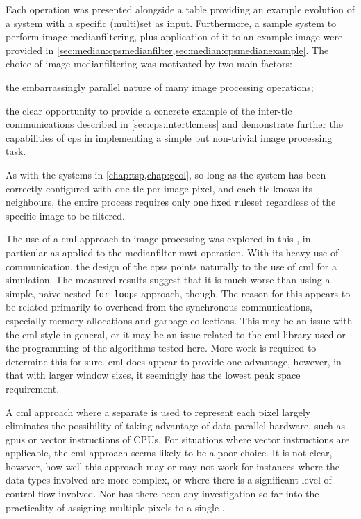 Each operation was presented alongside a table providing an example evolution of a system with a specific (multi)set as input.  Furthermore, a sample system to perform image \gls{medianfilter}ing, plus application of it to an example image were provided in \cref{sec:median:cpsmedianfilter,sec:median:cpsmedianexample}.  The choice of image \gls{medianfilter}ing was motivated by two main factors:
\begin{inparaenum}[(i)]
\item the embarrassingly parallel nature of many image processing operations;
\item the clear opportunity to provide a concrete example of the inter-\gls{tlc} communications described in \cref{sec:cps:intertlcmess} and demonstrate further the capabilities of \gls{cps} in implementing a simple but non-trivial image processing task.
\end{inparaenum}
As with the systems in \cref{chap:tsp,chap:gcol}, so long as the system has been correctly configured with one \gls{tlc} per image pixel, and each \gls{tlc} knows its neighbours, the entire process requires only one fixed ruleset regardless of the specific image to be filtered.

The use of a \gls{cml} approach to image processing was explored in this , in particular as applied to the \gls{medianfilter} \gls{mwt} operation.  With its heavy use of communication, the design of the \glspl{cps} points naturally to the use of \gls{cml} for a simulation.  The measured results suggest that it is much worse than using a simple, naïve nested \texttt{for loop}s approach, though.  The reason for this appears to be related primarily to overhead from the synchronous communications, especially memory allocations and garbage collections.  This may be an issue with the \gls{cml} style in general, or it may be an issue related to the \gls{cml} library used or the programming of the algorithms tested here.  More work is required to determine this for sure.  \Gls{cml} does appear to provide one advantage, however, in that with larger window sizes, it seemingly has the lowest peak space requirement.

A \gls{cml} approach where a separate  is used to represent each pixel largely eliminates the possibility of taking advantage of data-parallel hardware, such as \glspl{gpu} or vector instructions of CPUs.  For situations where vector instructions are applicable, the \gls{cml} approach seems likely to be a poor choice.  It is not clear, however, how well this approach may or may not work for instances where the data types involved are more complex, or where there is a significant level of control flow involved.  Nor has there been any investigation so far into the practicality of assigning multiple pixels to a single .